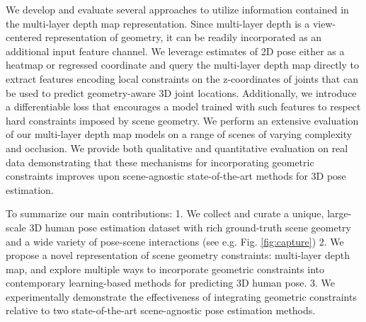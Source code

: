 \documentclass[times,referee,twocolumn,final,authoryear]{elsarticle}
\begin{document}
We develop and evaluate several approaches to utilize information contained in the 
multi-layer depth map representation. Since multi-layer depth is a view-centered 
representation of geometry, it can be readily incorporated as an additional input 
feature channel. We leverage estimates of 2D pose either as a heatmap or regressed 
coordinate and query the multi-layer depth map directly to extract features encoding 
local constraints on the z-coordinates of joints that can be used to predict
geometry-aware 3D joint locations.  Additionally, we introduce a differentiable
loss that encourages a model trained with such features to respect hard
constraints imposed by scene geometry.  We perform an extensive evaluation of
our multi-layer depth map models on a range of scenes of varying complexity and
occlusion.  We provide both qualitative and quantitative evaluation on real
data demonstrating that these mechanisms for incorporating geometric constraints
improves upon scene-agnostic state-of-the-art methods for 3D pose estimation. 

To summarize our main contributions:
1. We collect and curate a unique, large-scale 3D human pose estimation
dataset with rich ground-truth scene geometry and a wide variety of pose-scene
interactions (see e.g. Fig. \ref{fig:capture})
2. We propose a novel representation of scene geometry constraints:
multi-layer depth map, and explore multiple ways to incorporate geometric
constraints into contemporary learning-based methods for predicting 3D human
pose.
3. We experimentally demonstrate the effectiveness of integrating
geometric constraints relative to two state-of-the-art scene-agnostic
pose estimation methods.
\end{document}
